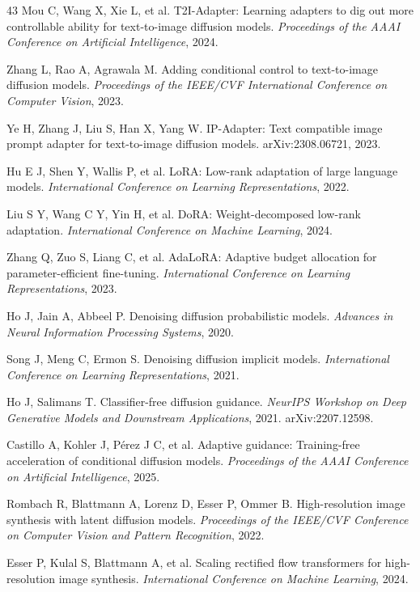 \documentclass[times,twocolumn,final]{elsarticle}
\begin{document}
\begin{thebibliography}{43}
Mou C, Wang X, Xie L, et al. T2I-Adapter: Learning adapters to dig out more controllable ability for text-to-image diffusion models. \textit{Proceedings of the AAAI Conference on Artificial Intelligence}, 2024.

Zhang L, Rao A, Agrawala M. Adding conditional control to text-to-image diffusion models. \textit{Proceedings of the IEEE/CVF International Conference on Computer Vision}, 2023.

Ye H, Zhang J, Liu S, Han X, Yang W. IP-Adapter: Text compatible image prompt adapter for text-to-image diffusion models. arXiv:2308.06721, 2023.

Hu E J, Shen Y, Wallis P, et al. LoRA: Low-rank adaptation of large language models. \textit{International Conference on Learning Representations}, 2022.

Liu S Y, Wang C Y, Yin H, et al. DoRA: Weight-decomposed low-rank adaptation. \textit{International Conference on Machine Learning}, 2024.

Zhang Q, Zuo S, Liang C, et al. AdaLoRA: Adaptive budget allocation for parameter-efficient fine-tuning. \textit{International Conference on Learning Representations}, 2023.

Ho J, Jain A, Abbeel P. Denoising diffusion probabilistic models. \textit{Advances in Neural Information Processing Systems}, 2020.

Song J, Meng C, Ermon S. Denoising diffusion implicit models. \textit{International Conference on Learning Representations}, 2021.

Ho J, Salimans T. Classifier-free diffusion guidance. \textit{NeurIPS Workshop on Deep Generative Models and Downstream Applications}, 2021. arXiv:2207.12598.

Castillo A, Kohler J, P\'erez J C, et al. Adaptive guidance: Training-free acceleration of conditional diffusion models. \textit{Proceedings of the AAAI Conference on Artificial Intelligence}, 2025.

Rombach R, Blattmann A, Lorenz D, Esser P, Ommer B. High-resolution image synthesis with latent diffusion models. \textit{Proceedings of the IEEE/CVF Conference on Computer Vision and Pattern Recognition}, 2022.

Esser P, Kulal S, Blattmann A, et al. Scaling rectified flow transformers for high-resolution image synthesis. \textit{International Conference on Machine Learning}, 2024.


\end{thebibliography}
\end{document}
